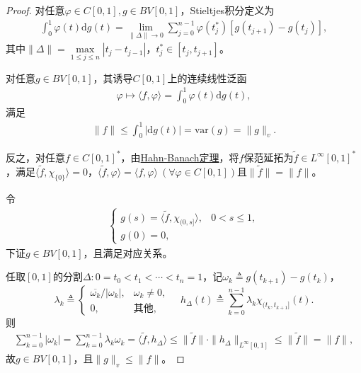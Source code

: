 \documentclass[../../main.tex]{subfiles}%
\begin{document}
\begin{proof}

对任意$\varphi\in C[0,1],g\in BV[0,1]$，Stieltjes积分定义为
\begin{align*}
\int_{0}^{1}\varphi(t)\mathrm{d}g(t)=\lim\limits_{\|\Delta\|\to0}\sum\limits_{j=0}^{n-1}\varphi(t_j^*)[g(t_{j+1})-g(t_j)],
\end{align*}
其中$\|\Delta\|=\max\limits_{1\leqslant j\leqslant n}|t_j-t_{j-1}|$，$t_j^*\in[t_j,t_{j+1}]$。

对任意$g\in BV[0,1]$，其诱导$C[0,1]$上的连续线性泛函
\begin{align*}
\varphi\mapsto\langle f,\varphi\rangle=\int_{0}^{1}\varphi(t)\mathrm{d}g(t),
\end{align*}
满足
\begin{align}
\|f\|\leqslant\int_{0}^{1}|\mathrm{d}g(t)|=\mathrm{var}(g)=\|g\|_v.\label{eq:bstieltnorm}
\end{align}

反之，对任意$f\in C[0,1]^*$，由\hyperref[theorem:泛函分析--(哈恩-巴拿赫)Hahn-Banach定理]{Hahn-Banach定理}，将$f$保范延拓为$\widetilde{f}\in L^\infty[0,1]^*$，满足$\langle\widetilde{f},\chi_{\{0\}}\rangle=0$，$\langle\widetilde{f},\varphi\rangle=\langle f,\varphi\rangle\ (\forall\varphi\in C[0,1])$且$\|\widetilde{f}\|=\|f\|$。

令
\begin{align*}
\begin{cases}
g(s)=\langle\widetilde{f},\chi_{(0,s]}\rangle,&0<s\leqslant1,\\
g(0)=0,
\end{cases}
\end{align*}
下证$g\in BV[0,1]$，且满足对应关系。

任取$[0,1]$的分割$\Delta:0=t_0<t_1<\cdots<t_n=1$，记$\omega_k\triangleq g(t_{k+1})-g(t_k)$，
\[
\lambda_k\triangleq
\begin{cases}
\overline{\omega_k}/|\omega_k|,&\omega_k\neq0,\\
0,&\text{其他},
\end{cases}
\quad
h_\Delta(t)\triangleq\sum\limits_{k=0}^{n-1}\lambda_k\chi_{(t_k,t_{k+1}]}(t).
\]
则
\begin{align*}
\sum\limits_{k=0}^{n-1}|\omega_k|=\sum\limits_{k=0}^{n-1}\lambda_k\omega_k=\langle\widetilde{f},h_\Delta\rangle
\leqslant\|\widetilde{f}\|\cdot\|h_\Delta\|_{L^\infty[0,1]}\leqslant\|\widetilde{f}\|=\|f\|,
\end{align*}
故$g\in BV[0,1]$，且$\|g\|_v\leqslant\|f\|$。


\end{proof}
\end{document}

